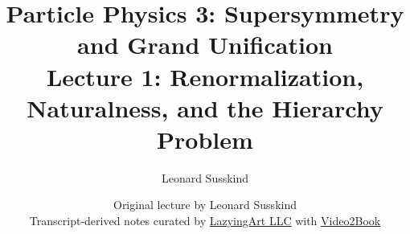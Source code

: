 \documentclass[11pt,oneside]{book}
\begin{document}
\frontmatter
\title{Particle Physics 3: Supersymmetry and Grand Unification\\[0.5em]
\large Lecture 1: Renormalization, Naturalness, and the Hierarchy Problem}
\author{Leonard Susskind}
\date{Original lecture by Leonard Susskind\\[0.4em]
Transcript-derived notes curated by
\href{https://lazying.art}{LazyingArt LLC} with
\href{https://github.com/lachlanchen/Video2Book}{Video2Book}}
\maketitle
\mainmatter

\end{document}

